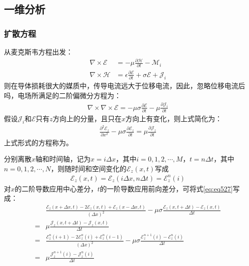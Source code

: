 \documentclass{article}
\numberwithin{equation}{section}
\renewcommand{\vec}[1]{\boldsymbol{#1}}
\begin{document}
\subsection{一维分析}
\subsubsection{扩散方程}
从麦克斯韦方程出发：
\begin{align}
    \label{eq:eq524}
    \nabla \times \vec{\mathcal{E}}&=-\mu\frac{\partial \vec{\mathcal{H}}}{\partial t}-\vec{\mathcal{M}}_i \\
    \label{eq:eq525}
    \nabla \times \vec{\mathcal{H}}&=\epsilon\frac{\partial \vec{\mathcal{E}}}{\partial t}+\sigma\vec{\mathcal{E}} +\vec{\mathcal{J}}_{i}
\end{align}
则在导体损耗很大的媒质中，传导电流远大于位移电流，因此，忽略位移电流后吗，电场所满足的二阶偏微分方程为：
\begin{align}
    \label{eq:eq526}
    \nabla \times \nabla \times \vec{\mathcal{E}}=-\mu\sigma\frac{\partial \vec{\mathcal{E}}}{\partial t}-\mu\frac{\partial\vec{\mathcal{J}}_{i}}{\partial t}
\end{align}
假设$\vec{\mathcal{J}}_{i}$和$\vec{\mathcal{E}}$只有$z$方向上的分量，且只在$x$方向上有变化，则上式简化为：
\begin{align}
    \label{eq:eq527}
    \frac{\partial^2 \mathcal{E}_z}{\partial x^2}-\mu\sigma\frac{\partial \mathcal{E}_z}{\partial t}=\mu\frac{\partial\mathcal{J}_{z}}{\partial t}
\end{align}
上式形式的方程称为\textbf{\color{blue}{扩散方程}}。\par
分别离散$x$轴和时间轴，记为$x=i\Delta x$，其中$i=0,1,2,\cdots,M$，$t=n\Delta t$，其中$n=0,1,2,\cdots,N$，则随时间和空间变化的$\mathcal{E}_z(x,t)$写成
\begin{align}
    \label{eq:eq528}
    \mathcal{E}_z(x,t)=\mathcal{E}_z(i\Delta x,n\Delta t)=\mathcal{E}_z^n(i)
\end{align}
对$x$的二阶导数应用中心差分，$t$的一阶导数应用前向差分，可将式\ref{eq:eq527}写成：
\begin{align}
    \label{eq:eq529}
     &\frac{\mathcal{E}_z(x+\Delta x,t)-2\mathcal{E}_z(x,t)+\mathcal{E}_z(x-\Delta x,t)}{(\Delta x)^2}-\mu\sigma\frac{\mathcal{E}_z(x,t+\Delta t)-\mathcal{E}_z(x,t)}{\Delta t} \nonumber \\
    =&\mu\frac{\mathcal{J}_z(x,t+\Delta t)-\mathcal{J}_z(x,t)}{\Delta t} \nonumber \\
    =&\frac{\mathcal{E}_z^n(i+1)-2\mathcal{E}_z^n(i)+\mathcal{E}_z^n(i-1)}{(\Delta x)^2}-\mu\sigma\frac{\mathcal{E}_z^{n+1}(i)-\mathcal{E}_z^n(i)}{\Delta t} \nonumber \\
    =&\mu\frac{\mathcal{J}_z^{n+1}(i)-\mathcal{J}_z^{n}(i)}{\Delta t}
\end{align}
\end{document}
